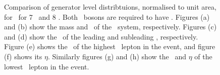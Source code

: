 \begin{figure}
{    }
        \vspace{-2mm}
        \vspace{-2mm}
    \caption{\small Comparison of generator level distribtuions, normalised to
    unit area, for \ZZllll\ for 7
    \tev\ and 8 \tev. Both \Z\ bosons are required to have \sstooosZ. Figures (a)
    and (b) show the mass and \pt\ of the \ZZ\ system,
    respectively. Figures (c) and (d) show the \pt\ of the
    leading and subleading \Z, respectively. Figure (e) shows the \pt\ of the highest \pt\ lepton in the event, and figure (f) shows its
   $\eta$. Similarly figures (g) and (h) show the \pt\ and $\eta$ of the lowest
   \pt\ lepton in the event.}
    \label{fig:gen-comp-7-8-ZZ}
\end{figure}

